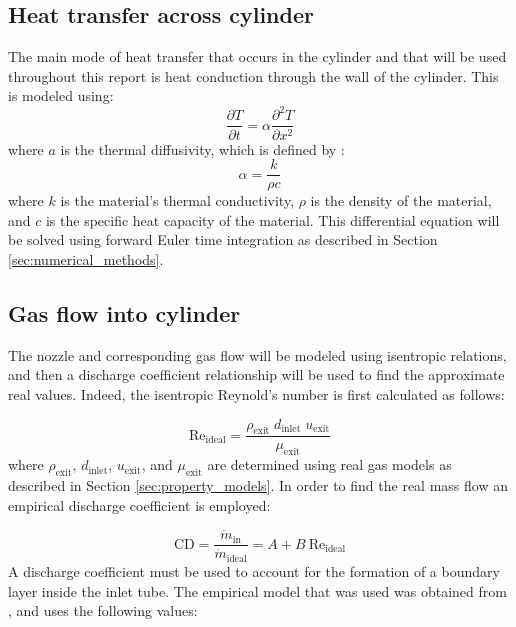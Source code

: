 





\subsection{Heat transfer across cylinder}

The main mode of heat transfer that occurs in the cylinder and that will be used throughout this report is heat conduction through the wall of the cylinder. This is modeled using:
\begin{equation}
\frac{\partial T}{\partial t} = \alpha \frac{\partial^2 T }{\partial x^2}
\end{equation}
where $a$ is the thermal diffusivity, which is defined by :
\begin{equation}
\alpha = \frac{k}{\rho c}
\end{equation}
where $k$ is the material's thermal conductivity, $\rho$ is the density of the material, and $c$ is the specific heat capacity of the material. This differential equation will be solved using forward Euler time integration as described in Section \ref{sec:numerical_methods}.

\subsection{Gas flow into cylinder}

The nozzle and corresponding gas flow will be modeled using isentropic relations, and then a discharge coefficient relationship will be used to find the approximate real values. Indeed, the isentropic Reynold's number is first calculated as follows:

\begin{equation}
\text{Re}_{\text{ideal}} = \frac{\rho_{\text{exit}}\;d_{\text{inlet}}\;u_{\text{exit}}}{\mu_{\text{exit}}}
\end{equation}
where $\rho_{\text{exit}}$, $d_{\text{inlet}}$, $u_{\text{exit}}$, and $\mu_{\text{exit}}$ are determined using real gas models as described in Section \ref{sec:property_models}. In order to find the real mass flow an empirical discharge coefficient is employed:

\begin{equation}
\text{CD} = \frac{\dot{m}_{\text{in}}}{\dot{m}_{\text{ideal}}} = A + B \:\text{Re}_{\text{ideal}} 
\end{equation}
A discharge coefficient must be used to account for the formation of a boundary layer inside the inlet tube. The empirical model that was used was obtained from , and uses the following values:

